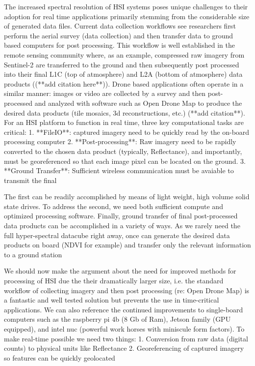 The increased spectral resolution of HSI systems poses unique challenges to their adoption for real time applications primarily stemming from the considerable size of generated data files. Current data collection workflows see researchers first perform the aerial survey (data collection) and then transfer data to ground based computers for post processing. This workflow is well established in the remote sensing community where, as an example, compressed raw imagery from Sentinel-2 are transferred to the ground and then subsequently post processed into their final L1C (top of atmosphere) and L2A (bottom of atmosphere) data products ((**add citation here**)). Drone based applications often operate in a similar manner: images or video are collected by a survey and then post-processed and analyzed with software such as Open Drone Map to produce the desired data products (tile mosaics, 3d reconstructions, etc.) (**add citation**). For an HSI platform to function in real time, three key computational tasks are critical: 
1. **FileIO**: captured imagery need to be quickly read by the on-board processing computer
2. **Post-processing**: Raw imagery need to be rapidly converted to the chosen data product (typically, Reflectance), and importantly, must be georeferenced so that each image pixel can be located on the ground.
3. **Ground Transfer**: Sufficient wireless communication must be avaiable to transmit the final 

The first can be readily accomplished by means of light weight, high volume solid state drives. To address the second, we need both sufficient compute and optimized processing software. Finally, ground transfer of final post-processed data products can be accomplished in a variety of ways. As we rarely need the full hyper-spectral datacube right away, once can generate the desired data products on board (NDVI for example) and transfer only the relevant information to a ground station 

We should now make the argument about the need for improved methods for processing of HSI due the their dramatically larger size, i.e. the standard workflow of collecting imagery and then post processing (re: Open Drone Map) is a fantastic and well tested solution but prevents the use in time-critical applications. We can also reference the continued improvements to single-board computers such as the raspberry pi 4b (8 Gb of Ram), Jetson family (GPU equipped), and intel nuc (powerful work horses with miniscule form factors). To make real-time possible we need two things: 
1. Conversion from raw data (digital counts) to physical units like Reflectance 
2. Georeferencing of captured imagery so features can be quickly geolocated

